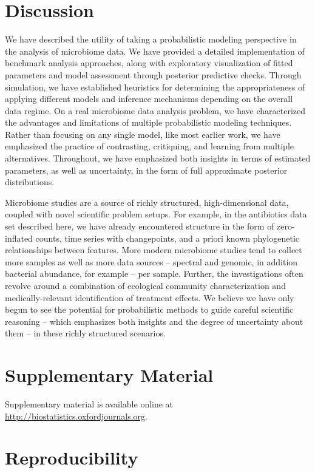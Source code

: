 \documentclass[oupdraft]{bio}
\begin{document}
\section{Discussion}

We have described the utility of taking a probabilistic modeling perspective in the
analysis of microbiome data. We have provided a detailed implementation of benchmark
analysis approaches, along with exploratory visualization of fitted parameters
and model assessment through posterior predictive checks. Through simulation, we
have established heuristics for determining the appropriateness of applying
different models and inference mechanisms depending on the overall data regime. On a real
microbiome data analysis problem, we have characterized the advantages and
limitations of multiple probabilistic modeling techniques. Rather than focusing
on any single model, like most earlier work, we have emphasized the practice of
contrasting, critiquing, and learning from multiple alternatives. Throughout, we
have emphasized both insights in terms of estimated parameters, as well as
uncertainty, in the form of full approximate posterior distributions.

Microbiome studies are a source of richly structured, high-dimensional data,
coupled with novel scientific problem setups. For example, in the
antibiotics data set described here, we have already encountered structure in
the form of zero-inflated counts, time series with changepoints, and a priori
known phylogenetic relationships between features. More modern microbiome
studies tend to collect more samples as well as more data sources -- spectral
and genomic, in addition bacterial abundance, for example -- per sample.
Further, the investigations often revolve around a combination of
ecological community characterization and medically-relevant identification of
treatment effects. We believe we have only begun to see the potential for
probabilistic methods to guide careful scientific reasoning -- which emphasizes
both insights and the degree of uncertainty about them -- in these richly
structured scenarios.

\section{Supplementary Material}

Supplementary material is available online at
\url{http://biostatistics.oxfordjournals.org}.

\section{Reproducibility}
\end{document}
